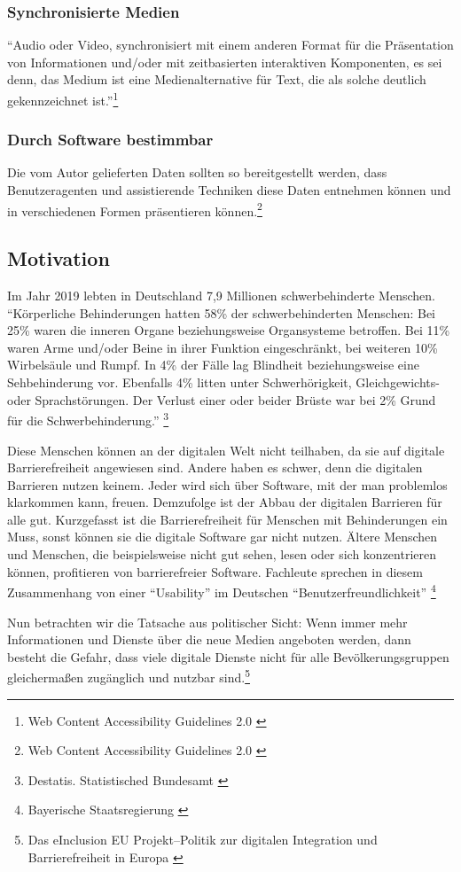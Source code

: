 \subsubsection{Synchronisierte Medien}
"`Audio oder Video, synchronisiert mit einem anderen Format für die Präsentation von Informationen und/oder mit zeitbasierten interaktiven 
Komponenten, es sei denn, das Medium ist eine Medienalternative für Text, die als solche deutlich gekennzeichnet 
ist."'\footnote{Web Content Accessibility Guidelines 2.0 \cite{WCAG2.0}}

\subsubsection{Durch Software bestimmbar}
Die vom Autor gelieferten Daten sollten so bereitgestellt werden, dass Benutzeragenten und assistierende Techniken diese Daten entnehmen können und in verschiedenen
Formen präsentieren können.\footnote{Web Content Accessibility Guidelines 2.0 \cite{WCAG2.0}}

\subsection{Motivation}
\label{subsec: Motivation}

Im Jahr 2019 lebten in Deutschland 7,9 Millionen schwerbehinderte Menschen. "`Körperliche Behinderungen hatten 58\% der schwerbehinderten Menschen: Bei 25\% waren die inneren Organe beziehungsweise Organsysteme betroffen. Bei 11\% waren Arme und/oder Beine in ihrer Funktion eingeschränkt, bei weiteren 10\% Wirbelsäule und Rumpf. In 4\% der Fälle lag Blindheit beziehungsweise eine Sehbehinderung vor. Ebenfalls 4\% litten unter Schwerhörigkeit, Gleichgewichts- oder Sprachstörungen. Der Verlust einer oder beider Brüste war bei 2\% Grund für die Schwerbehinderung."' \footnote{Destatis. Statistisched Bundesamt \cite{DESTATIS}}

Diese Menschen können an der digitalen Welt nicht teilhaben, da sie auf digitale Barrierefreiheit angewiesen sind. Andere haben es schwer, denn die digitalen Barrieren nutzen keinem. Jeder wird sich über Software, mit der man problemlos klarkommen kann, freuen. Demzufolge ist der Abbau der digitalen Barrieren für alle gut. Kurzgefasst ist die Barrierefreiheit für Menschen mit Behinderungen ein Muss, sonst können sie die digitale Software gar nicht nutzen. Ältere Menschen und Menschen, die beispielsweise nicht gut sehen, lesen oder sich konzentrieren können, profitieren von barrierefreier Software. Fachleute sprechen in diesem Zusammenhang von einer "`Usability"' im Deutschen "`Benutzerfreundlichkeit"' \footnote{Bayerische Staatsregierung \cite{BS}}

Nun betrachten wir die Tatsache aus politischer Sicht: Wenn immer mehr Informationen und Dienste über die neue Medien angeboten werden, dann besteht die Gefahr, dass viele digitale Dienste nicht für alle Bevölkerungsgruppen gleichermaßen zugänglich und nutzbar sind.\footnote{Das eInclusion EU Projekt--Politik zur digitalen Integration und Barrierefreiheit in Europa \cite{redingeinclusion}}